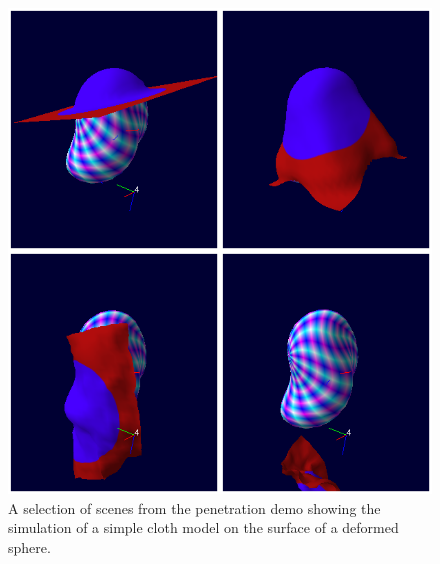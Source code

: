 \begin{figure}[p]
\centering
\includegraphics[width=\textwidth]{cloth_montage}
\caption{\label{fig:cloth_montage}%
  A selection of scenes from the penetration demo showing the
  simulation of a simple cloth model on the surface of a deformed
  sphere.
}
\end{figure}

